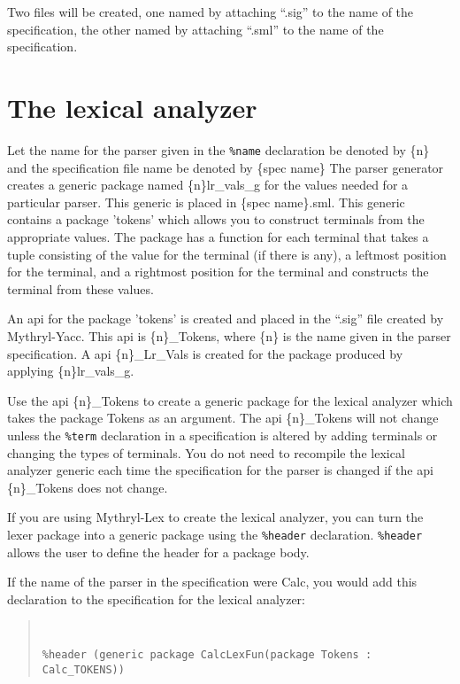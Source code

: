 Two files will be created, one named by
attaching ``.sig'' to the name of the specification, the other named by
attaching ``.sml'' to the name of the specification.

\section{The lexical analyzer}

Let the name for
the parser given in the {\tt \%name} declaration be denoted by \{n\} and
the specification file name be denoted by \{spec name\}
The parser generator creates a generic package named \{n\}lr_vals_g for
the values needed for a particular parser.  This generic is placed
in \{spec name\}.sml.  This
generic contains a package
'tokens' which allows you to construct terminals from the appropriate
values.  The package has a function for each terminal that takes a tuple
consisting of  the value for the terminal (if there is any), a leftmost
position for the terminal, and a rightmost position for the terminal and
constructs the terminal from these values.

An api for the package 'tokens' is created and placed in the ``.sig''
file created by Mythryl-Yacc.  This api is \{n\}\_Tokens,
 where \{n\} is
the name given in the parser specification.  A api
\{n\}\_Lr_Vals is created for the package produced by
applying \{n\}lr_vals_g.

Use the api \{n\}\_Tokens to create a generic package for the
lexical analyzer which takes the package Tokens as an argument.  The
api \{n\}\_Tokens
will not change unless the {\tt \%term} declaration in a
specification is altered by adding terminals or
changing the types of terminals.  You do not need to recompile
the lexical analyzer generic each time the specification for
the parser is changed if the
api \{n\}\_Tokens does not change.

If you are using Mythryl-Lex to create the lexical analyzer, you
can turn the lexer package into a generic package using the
{\tt \%header} declaration.
{\tt \%header} allows the user to define the header for a package body.

If the name of the parser in the specification were Calc, you
would add this declaration to the specification for the lexical 
analyzer:
\begin{quote}
\tt
\begin{verbatim}
%header (generic package CalcLexFun(package Tokens : Calc_TOKENS))
\end{verbatim}
\end{quote}

